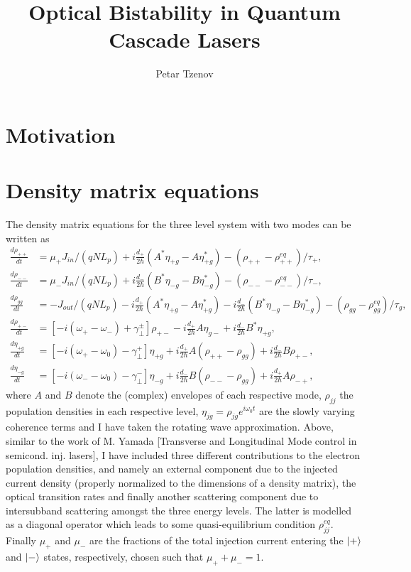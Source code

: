 \documentclass[preprint,secnumarabic,amssymb, nobibnotes, aip, prd]{revtex4-1}
\begin{document}
	\title{Optical Bistability in Quantum Cascade Lasers}
	\author{Petar Tzenov}
	\maketitle
	
	\section{Motivation}
	
	\section{Density matrix equations}
	The density matrix equations for the three level system with two modes can be written as 
	\begin{subequations}
		\label{eq:4eqns}
		\begin{align}
		\frac{d \rho_{++}}{dt} &= \mu_+ J_{in}/(qNL_p) + i\frac{d_{+}}{2\hbar}(A^*\eta_{+g}-A\eta_{+g}^*) - (\rho_{++}-\rho_{++}^{eq})/\tau_{+}, \\
		\frac{d \rho_{--}}{dt} &= \mu_- J_{in}/(qNL_p) + i\frac{d_{-}}{2\hbar}(B^*\eta_{-g}-B\eta_{-g}^*) - (\rho_{--}-\rho_{--}^{eq})/\tau_{-}, \\
		\frac{d \rho_{gg}}{dt} &= -J_{out}/(qNL_p)- i\frac{d_{+}}{2\hbar}(A^*\eta_{+g}-A\eta_{+g}^*)-i\frac{d_{-}}{2\hbar}(B^*\eta_{-g}-B\eta_{-g}^*)  - (\rho_{gg}-\rho_{gg}^{eq})/\tau_{g}, \\
		\frac{d \rho_{+-}}{dt} &= [-i(\omega_+-\omega_-)+\gamma_{\perp}^{\pm}]\rho_{+-}-i\frac{d_{+}}{2\hbar}A\eta_{g-}+i\frac{d_{-}}{2\hbar}B^*\eta_{+g},\\
		\frac{d \eta_{+g}}{dt} &= [-i(\omega_+-\omega_{0})-\gamma_{\perp}^{+}]\eta_{+g}+i\frac{d_{+}}{2\hbar}A(\rho_{++}-\rho_{gg})+i\frac{d_{-}}{2\hbar}B\rho_{+-}, \label{eq:eta+g}\\
		\frac{d \eta_{-g}}{dt} &= [-i(\omega_--\omega_{0})-\gamma_{\perp}^{-}]\eta_{-g}+i\frac{d_{-}}{2\hbar}B(\rho_{--}-\rho_{gg})+i\frac{d_{+}}{2\hbar}A\rho_{-+}, \label{eq:eta-g}
		\end{align}
	\end{subequations}
	where $A$ and $B$ denote the (complex) envelopes of each respective mode, $\rho_{jj}$  the population densities in each respective level, $\eta_{jg} = \rho_{jg}e^{i\omega_0 t}$ are the slowly varying coherence terms and I have taken the rotating wave approximation. Above, similar to the work of M. Yamada [Transverse and Longitudinal Mode control in semicond. inj. lasers], I have included three different contributions to the electron population densities, and namely an external component due to the injected current density (properly normalized to the dimensions of a density matrix), the optical transition rates and finally another scattering component due to intersubband scattering amongst the three energy levels. The latter is modelled as a diagonal operator which leads to some quasi-equilibrium condition $\rho_{jj}^{eq}$. Finally $\mu_{+}$ and $\mu_{-}$ are the fractions of the total injection current entering the $\ket{+}$ and $\ket{-}$ states, respectively, chosen such that $\mu_{+}+\mu_{-}=1$.
	
\end{document}
